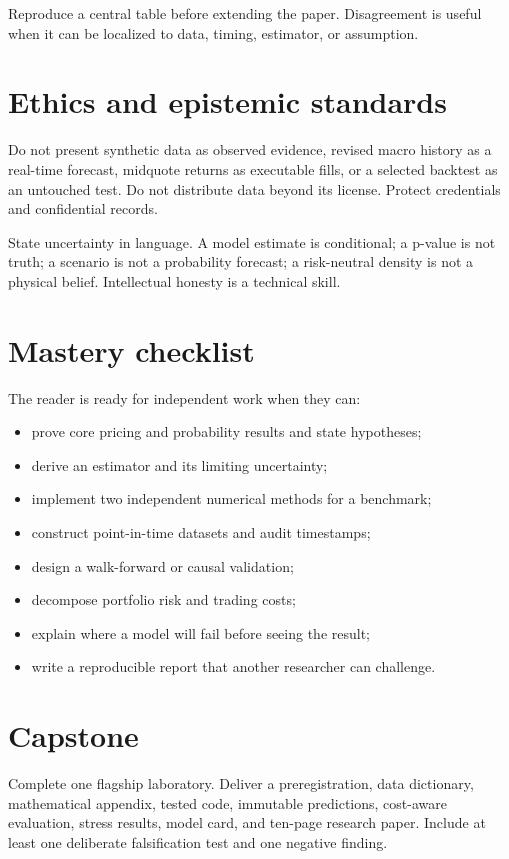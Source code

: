 Reproduce a central table before extending the paper. Disagreement is useful when it
can be localized to data, timing, estimator, or assumption.

\section{Ethics and epistemic standards}

Do not present synthetic data as observed evidence, revised macro history as a
real-time forecast, midquote returns as executable fills, or a selected backtest as
an untouched test. Do not distribute data beyond its license. Protect credentials
and confidential records.

State uncertainty in language. A model estimate is conditional; a p-value is not
truth; a scenario is not a probability forecast; a risk-neutral density is not a
physical belief. Intellectual honesty is a technical skill.

\section{Mastery checklist}

The reader is ready for independent work when they can:

\begin{itemize}
\item prove core pricing and probability results and state hypotheses;
\item derive an estimator and its limiting uncertainty;
\item implement two independent numerical methods for a benchmark;
\item construct point-in-time datasets and audit timestamps;
\item design a walk-forward or causal validation;
\item decompose portfolio risk and trading costs;
\item explain where a model will fail before seeing the result;
\item write a reproducible report that another researcher can challenge.
\end{itemize}

\section{Capstone}

\begin{exercise}
Complete one flagship laboratory. Deliver a preregistration, data dictionary,
mathematical appendix, tested code, immutable predictions, cost-aware evaluation,
stress results, model card, and ten-page research paper. Include at least one
deliberate falsification test and one negative finding.
\end{exercise}
